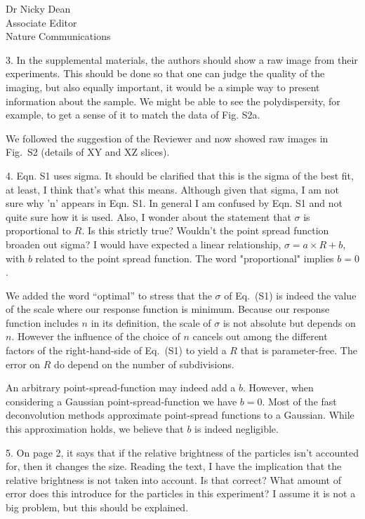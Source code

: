 \documentclass[a4paper, rebuttal, parskip=true, firsthead=false, fromemail=true, foldmarks=false]{scrlttr2}
\begin{document}
\begin{letter}{Dr Nicky Dean\\
Associate Editor\\
Nature Communications}
\begin{quotationi}
3. In the supplemental materials, the authors should show a raw image from their experiments. This should be done so that one can judge the quality of the imaging, but also equally important, it would be a simple way to present information about the sample. We might be able to see the polydispersity, for example, to get a sense of it to match the data of Fig. S2a.
\end{quotationi}
We followed the suggestion of the Reviewer and now showed raw images in Fig.~S2 (details of XY and XZ slices). 

\begin{quotationi}
4. Eqn. S1 uses sigma. It should be clarified that this is the sigma of the best fit, at least, I think that's what this means. Although given that sigma, I am not sure why 'n' appears in Eqn. S1. In general I am confused by Eqn. S1 and not quite sure how it is used. Also, I wonder about the statement that $\sigma$ is proportional to $R$. Is this strictly true? Wouldn't the point spread function broaden out sigma? I would have expected a linear relationship, $\sigma = a\times R + b$, with $b$ related to the point spread function. The word "proportional" implies $b=0$.
\end{quotationi}

We added the word ``optimal'' to stress that the $\sigma$ of Eq.~(S1) is indeed the value of the scale where our response function is minimum. Because our response function includes $n$ in its definition, the scale of $\sigma$ is not absolute but depends on $n$. However the influence of the choice of $n$ cancels out among the different factors of the right-hand-side of Eq.~(S1) to yield a $R$ that is parameter-free. The error on $R$ do depend on the number of subdivisions.

An arbitrary point-spread-function may indeed add a $b$. However, when considering a Gaussian point-spread-function we have $b=0$. Most of the fast deconvolution methods approximate point-spread functions to a Gaussian. While this approximation holds, we believe that $b$ is indeed negligible.


\begin{quotationi}
5. On page 2, it says that if the relative brightness of the particles isn't accounted for, then it changes the size. Reading the text, I have the implication that the relative brightness is not taken into account. Is that correct? What amount of error does this introduce for the particles in this experiment? I assume it is not a big problem, but this should be explained.
\end{quotationi}


\end{letter}
\end{document}
